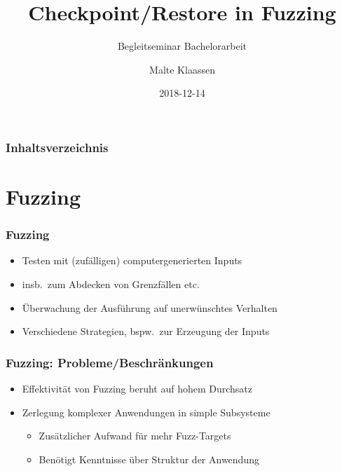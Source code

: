 \documentclass[handout]{beamer}
\title[Checkpoint/Restore in Fuzzing]{Checkpoint/Restore in Fuzzing}
\subtitle{Begleitseminar Bachelorarbeit}
\author[Klaassen]{Malte Klaassen}
\date{2018-12-14}
\begin{document}
\begin{frame}%
\titlepage
\end{frame}

\begin{frame}%
	\frametitle{Inhaltsverzeichnis}
	\tableofcontents%
\end{frame}

\section{Fuzzing}
\begin{frame}
    \frametitle{Fuzzing}
    \begin{itemize}
        \item Testen mit (zufälligen) computergenerierten Inputs
        \item insb.\ zum Abdecken von Grenzfällen etc.
        \item Überwachung der Ausführung auf unerwünschtes Verhalten
        \item Verschiedene Strategien, bspw.\ zur Erzeugung der Inputs
    \end{itemize}
\end{frame}

\begin{frame}
    \frametitle{Fuzzing: Probleme/Beschränkungen}
    \begin{itemize}
        \item Effektivität von Fuzzing beruht auf hohem Durchsatz
        \item Zerlegung komplexer Anwendungen in simple Subsysteme \begin{itemize}
                \item Zusätzlicher Aufwand für mehr Fuzz-Targets
                \item Benötigt Kenntnisse über Struktur der Anwendung
        \end{itemize}
    \end{itemize}
\end{frame}
\end{document}
